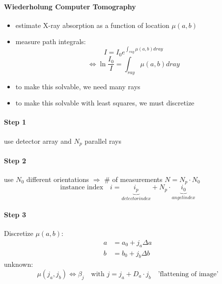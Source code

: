 \documentclass[11pt]{article}
\begin{document}
\begin{itemize}
      \paragraph{Wiederholung Computer Tomography}
      \begin{itemize}
        \item estimate X-ray absorption as a function of location $\mu(a, b)$
        \item measure path integrals:
        \begin{equation*}
          I = I_0 e^{\int_{ray} \mu(a,b) dray}
        \end{equation*}
        \begin{equation*}
          \iff \ln \frac{I_0}{I} = \int_{ray} \mu(a, b) dray
        \end{equation*}
        \item to make this solvable, we need many rays
        \item to make this solvable with least squares, we must discretize
      \end{itemize}
      \paragraph{Step 1} use detector array and $N_p$ parallel rays
      \paragraph{Step 2} use $N_0$ different orientations
      $\Rightarrow$ $\#$ of measurements $N=N_p \cdot N_0$
      \begin{equation*}
        \text{instance index} \quad i = \underbrace{i_p}_{detector index} + N_p
        \cdot \underbrace{i_0}_{angel index}
      \end{equation*}
      \paragraph{Step 3} Discretize $\mu(a,b)$:
      \begin{equation*}
        \begin{align*}
          a &= a_0 + j_a \Delta a \\
          b &= b_0 + j_b \Delta b
        \end{align*}
      \end{equation*}
      unknown:
      \begin{equation*}
        \mu(j_a, j_b) \iff \beta_j \quad \text{with } j = j_a + D_a \cdot j_b \quad
        \text{'flattening of image'}
      \end{equation*}

\end{itemize}
\end{document}
